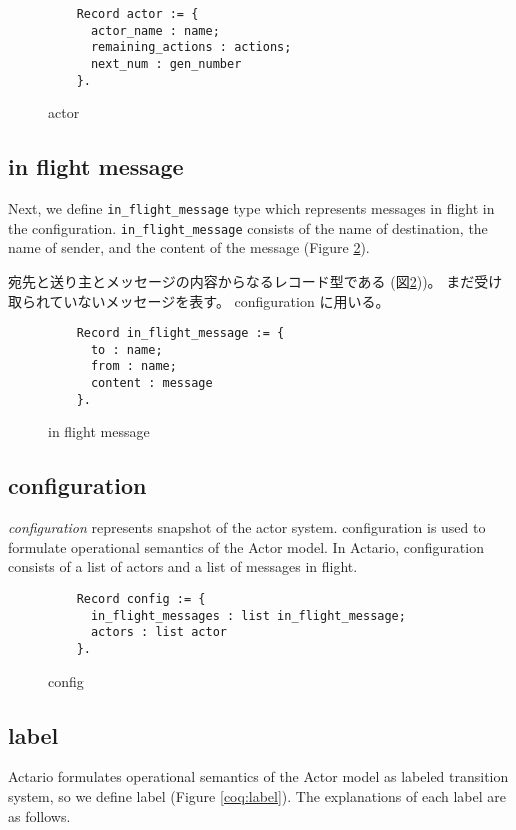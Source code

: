 \begin{figure}[t]
  \begin{lstlisting}
    Record actor := {
      actor_name : name;
      remaining_actions : actions;
      next_num : gen_number
    }.
  \end{lstlisting}
  \caption{actor}\label{coq:actor}
\end{figure}

\subsection{in flight message}
Next, we define \lstinline|in_flight_message| type which represents messages in flight in the configuration.
\lstinline|in_flight_message| consists of the name of destination, the name of sender, and the content of the message (Figure \ref{coq:inflight}).

宛先と送り主とメッセージの内容からなるレコード型である (図\ref{coq:inflight}))。
まだ受け取られていないメッセージを表す。
configuration に用いる。

\begin{figure}[t]
  \begin{lstlisting}
    Record in_flight_message := {
      to : name;
      from : name;
      content : message
    }.
  \end{lstlisting}
  \caption{in flight message}\label{coq:inflight}
\end{figure}

\subsection{configuration}
\textit{configuration} represents snapshot of the actor system.
configuration is used to formulate operational semantics of the Actor model.
In Actario, configuration consists of a list of actors and a list of messages in flight.

\begin{figure}[t]
  \begin{lstlisting}
    Record config := {
      in_flight_messages : list in_flight_message;
      actors : list actor
    }.
  \end{lstlisting}
  \caption{config}\label{coq:config}
\end{figure}


\subsection{label}
Actario formulates operational semantics of the Actor model as labeled transition system, so we define label (Figure \ref{coq:label}).
The explanations of each label are as follows.

